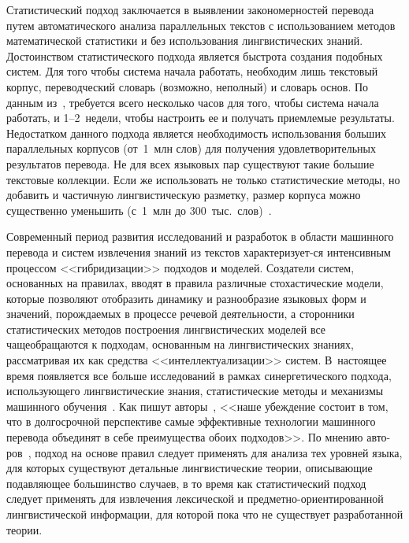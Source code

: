\begin{multicols}{2}
     Статистический подход заключается в выявлении закономерностей 
перевода путем автоматического анализа параллельных текстов с 
использованием методов математической статистики и без использования 
лингвистических знаний. Достоинством статистического подхода является 
быстрота создания подобных сис\-тем. Для того чтобы сис\-те\-ма начала 
работать, необходим лишь текстовый корпус, переводческий словарь 
(возможно, неполный) и словарь основ. По данным из~\cite{9-mor}, 
требуется всего несколько часов для того, чтобы сис\-те\-ма начала работать, и 
1--2~недели, чтобы настроить ее и получать приемлемые результаты. 
Недостатком данного подхода является необходимость использования 
больших параллельных корпусов (от~1~млн слов) для получения 
удовлетворительных результатов перевода. Не для всех языковых пар 
существуют такие большие текстовые коллекции. Если же использовать не 
только статистические методы, но добавить и частичную лингвистическую 
разметку, размер корпуса можно существенно уменьшить (с~1~млн до 
300~тыс.\ слов)~\cite{10-mor}.
     
     Современный период развития исследований и разработок в области 
машинного перевода и сис\-тем извлечения знаний из текстов характеризует-\linebreak ся 
интенсивным процессом <<гибридизации>> подходов и моделей. Создатели 
сис\-тем, основанных на правилах, вводят в правила различные стохастические 
модели, которые позволяют отобразить\linebreak
 динамику и разнообразие языковых 
форм и значений, порождаемых в процессе речевой дея\-тель\-ности, а 
сторонники статистических методов построения лингвистических моделей 
все чаще\linebreak обращаются к подходам, основанным на лингвистических знаниях, 
рассматривая их как средства <<интеллектуализации>> сис\-тем. В~настоящее 
время появляется все больше исследований в рамках синергетического 
подхода, использующего лингвистические знания, статистические методы и 
механизмы машинного обучения~\cite{3-mor}. Как пишут авторы~\cite{11-mor}, 
<<наше убеждение состоит в том, что в долгосрочной перспективе 
самые эффективные технологии машинного перевода объединят в себе 
преимущества обоих подходов>>. По мнению авто-\linebreak ров~\cite{11-mor}, подход на основе 
правил следует применять для анализа тех уровней языка, для которых\linebreak 
существуют детальные лингвистические теории, описывающие по\-дав\-ля\-ющее 
большинство случаев, в то время как статистический подход следует 
применять для извлечения лексической и предметно-ори\-ен\-ти\-ро\-ван\-ной 
лингвистической информации, для которой пока что не существует 
разработанной теории. 
     

\end{multicols}
